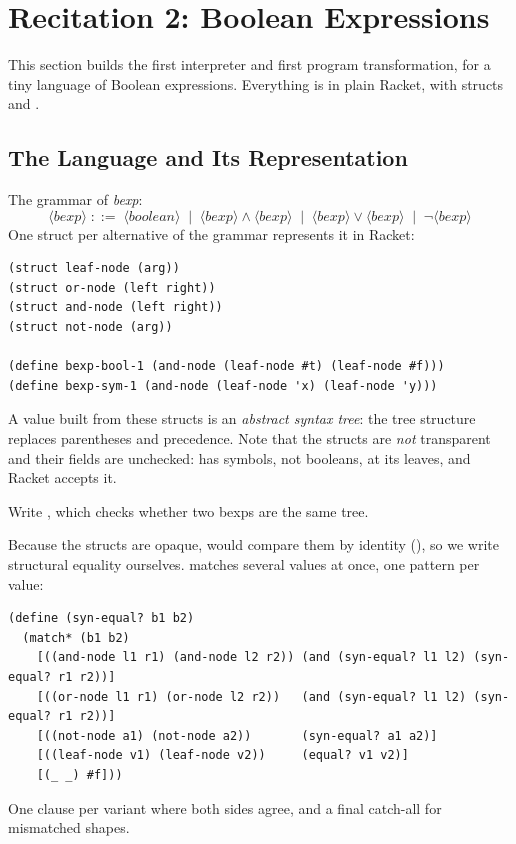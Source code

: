 \section{Recitation 2: Boolean Expressions}
\label{sec:rec2}

This section builds the first interpreter and first program transformation, for a tiny language of Boolean expressions. Everything is in plain Racket, with structs and .

\subsection{The Language and Its Representation}

The grammar of \emph{bexp}:
\[
\langle\textit{bexp}\rangle \;::=\; \langle\textit{boolean}\rangle \;\mid\; \langle\textit{bexp}\rangle \land \langle\textit{bexp}\rangle \;\mid\; \langle\textit{bexp}\rangle \lor \langle\textit{bexp}\rangle \;\mid\; \neg \langle\textit{bexp}\rangle
\]
One struct per alternative of the grammar represents it in Racket:
\begin{lstlisting}
(struct leaf-node (arg))
(struct or-node (left right))
(struct and-node (left right))
(struct not-node (arg))

(define bexp-bool-1 (and-node (leaf-node #t) (leaf-node #f)))
(define bexp-sym-1 (and-node (leaf-node 'x) (leaf-node 'y)))
\end{lstlisting}
A value built from these structs is an \emph{abstract syntax tree}: the tree structure replaces parentheses and precedence. Note that the structs are \emph{not} transparent and their fields are unchecked:  has symbols, not booleans, at its leaves, and Racket accepts it.

\begin{exercise}
Write , which checks whether two bexps are the same tree.
\end{exercise}
\begin{solution}
Because the structs are opaque,  would compare them by identity (), so we write structural equality ourselves.  matches several values at once, one pattern per value:
\begin{lstlisting}
(define (syn-equal? b1 b2)
  (match* (b1 b2)
    [((and-node l1 r1) (and-node l2 r2)) (and (syn-equal? l1 l2) (syn-equal? r1 r2))]
    [((or-node l1 r1) (or-node l2 r2))   (and (syn-equal? l1 l2) (syn-equal? r1 r2))]
    [((not-node a1) (not-node a2))       (syn-equal? a1 a2)]
    [((leaf-node v1) (leaf-node v2))     (equal? v1 v2)]
    [(_ _) #f]))
\end{lstlisting}
One clause per variant where both sides agree, and a final catch-all for mismatched shapes.
\end{solution}

